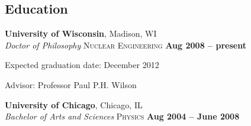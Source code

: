 \documentclass[margin,line]{resume}
\begin{document}
\begin{resume}
    \section{\mysidestyle Education}

    \textbf{University of Wisconsin}, Madison, WI \vspace{1mm}\\\vspace{1mm}%
    \textsl{Doctor of Philosophy} \textsc{Nuclear Engineering}\hfill \textbf{ Aug 2008 -- present}\vspace{-3mm}\\\vspace{-1mm}%
    \begin{list2}
        \item Expected graduation date: December 2012
        \item Advisor:  Professor Paul P.H. Wilson                
    \end{list2}
		\textbf{University of Chicago}, Chicago, IL \vspace{1mm}\\\vspace{1mm}%
		\textsl{Bachelor of Arts and Sciences}\textsc{ Physics} \hfill \textbf{Aug 2004 -- June 2008}\vspace{-3mm}\\\vspace{-1mm}%


\end{resume}
\end{document}
